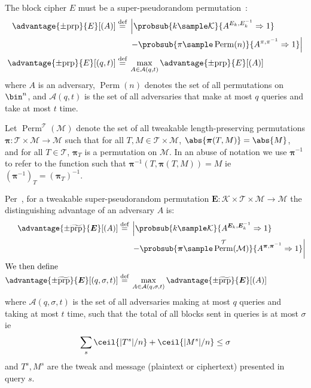 \documentclass[letterpaper,11pt]{article}
\newcommand*{\defeq}{\stackrel{\text{def}}{=}}
\DeclareMathOperator{\Perm}{Perm}
\begin{document}
The block cipher
$E$
must be a super-pseudorandom permutation~\cite{concrete}:
%
\begin{align*}
    \advantage{\pm \mathrm{prp}}{E}[(A)] \defeq
    {}&\left\lvert\probsub{k \sample \mathcal{K}}{A^{E_k,E_k^{-1}}\Rightarrow 1}\right.
    \\
    {}&\left. - \probsub{\pi \sample \Perm(n)}{A^{\pi,\pi^{-1}}\Rightarrow 1}\right\rvert
    \\
    \advantage{\pm \mathrm{prp}}{E}[(q, t)] \defeq
    {}&\max_{A \in \mathcal{A}(q, t)} \advantage{\pm \mathrm{prp}}{E}[(A)]
\end{align*}
%
where $A$ is an adversary,
$\Perm(n)$ denotes the set of all permutations on \(\bin^n\),
and
$\mathcal{A}(q, t)$
is the set of all adversaries that make at most $q$ queries and take at most $t$ time.

Let $\Perm^\mathcal{T}(\mathcal{M})$
denote the set of all
tweakable length-preserving permutations
$\bm{\pi} : \mathcal{T} \times \mathcal{M} \rightarrow \mathcal{M}$
such that for all $T, M \in \mathcal{T} \times \mathcal{M}$,
$\abs{\bm{\pi}(T, M)} = \abs{M}$, and
for all $T \in \mathcal{T}$, $\bm{\pi}_{T}$ is a permutation on \(\mathcal{M}\).
In an abuse of notation
we use $\bm{\pi}^{-1}$ to refer to the function
such that $\bm{\pi}^{-1}(T, \bm{\pi}(T, M)) = M$ ie $(\bm{\pi}^{-1})_T = (\bm{\pi}_T)^{-1}$.

Per~\cite{cmc}, for a tweakable super-pseudorandom permutation
$\bm{E} : \mathcal{K} \times \mathcal{T} \times \mathcal{M} \rightarrow \mathcal{M}$
the distinguishing advantage of an adversary $A$ is:
%
\begin{align*}
    \advantage{\pm \widetilde{\mathrm{prp}}}{\bm{E}}[(A)] \defeq
    {}&\left\lvert\probsub{k \sample \mathcal{K}}{A^{\bm{E}_k,\bm{E}_k^{-1}}\Rightarrow 1}\right.
    \\
    {}&\left. - \probsub{\bm{\pi} \sample \Perm^\mathcal{T}(\mathcal{M})}
        {A^{\bm{\pi},\bm{\pi}^{-1}}\Rightarrow 1}\right\rvert
    \\
    \intertext{We then define}
    \advantage{\pm \widetilde{\mathrm{prp}}}{\bm{E}}[(q, \sigma, t)]
    \defeq {}&
    \max_{A \in \mathcal{A}(q, \sigma, t)} \advantage{\pm \widetilde{\mathrm{prp}}}{\bm{E}}[(A)]
\end{align*}
where \(\mathcal{A}(q, \sigma, t)\)
is the set of all adversaries 
making at most \(q\) queries
and taking at most \(t\) time,
such that the total of all blocks sent in queries is
at most \(\sigma\) ie
\begin{displaymath}
    \sum_s \ceil{|T^s|/n} + \ceil{|M^s|/n} \leq \sigma
\end{displaymath}
and \(T^s, M^s\) are the tweak and message
(plaintext or ciphertext)
presented in query \(s\).
\end{document}
